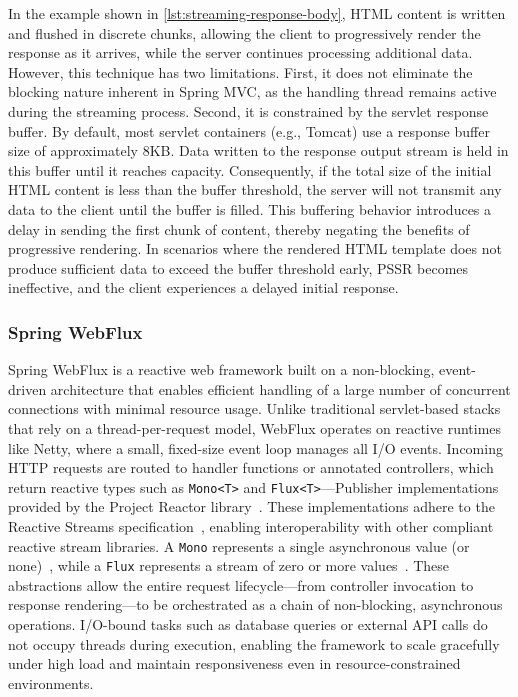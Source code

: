 In the example shown in \autoref{lst:streaming-response-body}, HTML content is written and flushed in discrete chunks,
allowing the client to progressively render the response as it arrives, while
the server continues processing additional data.
However, this technique has two limitations. First, it does not eliminate the
blocking nature inherent in Spring MVC, as the handling thread remains active
during the streaming process.
Second, it is constrained by the servlet response buffer.
By default, most servlet containers (e.g., Tomcat) use a
response buffer size of approximately 8KB. Data written to the response output
stream is held in this buffer until it reaches capacity. Consequently, if the
total size of the initial HTML content is less than the buffer threshold, the
server will not transmit any data to the client until the buffer is filled.
This buffering behavior introduces a delay in sending the first chunk of
content, thereby negating the benefits of progressive rendering. In scenarios
where the rendered HTML template does not produce sufficient data to exceed the
buffer threshold early, PSSR becomes ineffective, and the client experiences a
delayed initial response.

\subsubsection{Spring WebFlux}

Spring WebFlux is a reactive web framework built on a non-blocking,
event-driven architecture that enables efficient handling of a large number of
concurrent connections with minimal resource usage. Unlike traditional
servlet-based stacks that rely on a thread-per-request model, WebFlux operates
on reactive runtimes like Netty, where a small, fixed-size event loop manages
all I/O events.
Incoming HTTP requests are routed to handler functions or annotated controllers,
which return reactive types such as \texttt{Mono<T>} and
\texttt{Flux<T>}—Publisher implementations provided by the Project Reactor
library~\cite{projectreactor}. These implementations adhere to the Reactive
Streams specification~\cite{ReactiveStreams}, enabling interoperability with
other compliant reactive stream libraries.
A \texttt{Mono} represents a single asynchronous value (or
none)~\cite{promise}, while a \texttt{Flux} represents a stream of zero or more values~\cite{rx-observable}. These
abstractions allow the entire request lifecycle—from controller invocation to
response rendering—to be orchestrated as a chain of non-blocking, asynchronous
operations. I/O-bound tasks such as database queries or external API calls do
not occupy threads during execution, enabling the framework to scale gracefully
under high load and maintain responsiveness even in resource-constrained
environments.


